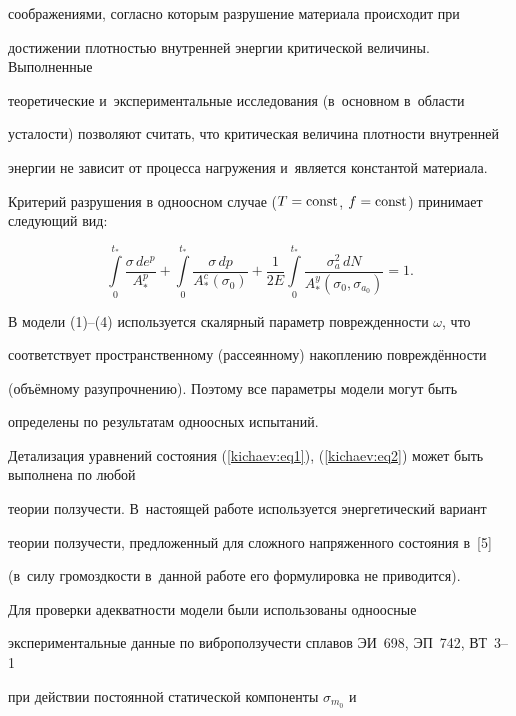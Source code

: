 соображениями, согласно которым разрушение материала происходит при 

достижении плотностью внутренней энергии критической величины. Выполненные 

теоретические и~экспериментальные исследования (в~основном в~области 

усталости) позволяют считать, что критическая величина плотности внутренней 

энергии не зависит от процесса нагружения и~является константой материала.



Критерий разрушения в одноосном случае ($T=\rm const$, $f=\rm const$) принимает следующий вид:

\begin{equation}

\int\limits_0^{t_\ast } \frac{\sigma \,de^p}{A_\ast ^p }+

\int\limits_0^{t_\ast } \frac{\sigma \,dp}{A_\ast ^c (\sigma _0 )}+

\frac{1}{2E}\int\limits_0^{t_\ast } \frac{\sigma _a^2\, dN}{A_\ast ^y 

(\sigma _0, \sigma _{a_0 } )} =1.

\end{equation}

В модели (1)--(4) используется скалярный параметр поврежденности $\omega $, что 

соответствует пространственному (рассеянному) накоплению повреждённости 

(объёмному разупрочнению). Поэтому все параметры модели могут быть 

определены по результатам одноосных испытаний. 



Детализация уравнений состояния (\ref{kichaev:eq1}), (\ref{kichaev:eq2}) может быть выполнена по любой 

теории ползучести. В~настоящей работе используется энергетический вариант 

теории ползучести, предложенный для сложного напряженного состояния в~[5] 

(в~силу громоздкости в~данной работе его формулировка не приводится).



Для проверки адекватности модели были использованы одноосные 

экспериментальные данные по виброползучести сплавов ЭИ~698, ЭП~742, ВТ~3--1 

при действии постоянной статической компоненты $\sigma_{m_0 } $ и 

